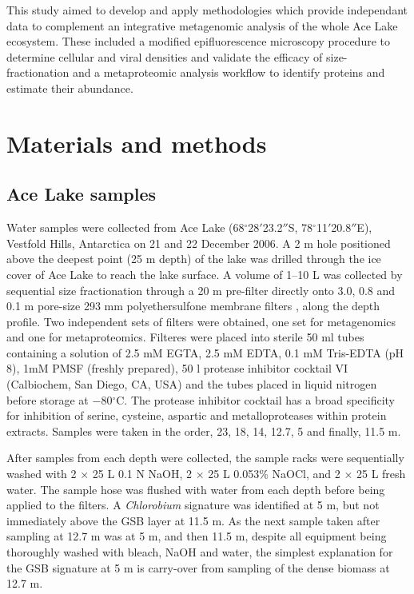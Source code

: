 This study aimed to develop and apply methodologies which provide independant data to complement an integrative metagenomic analysis of the whole Ace Lake ecosystem.
These included a modified epifluorescence microscopy procedure to determine cellular and viral densities and validate the efficacy of size-fractionation and a metaproteomic analysis workflow to identify proteins and estimate their abundance.


\section{Materials and methods}
\label{sec:ace_mm}
\subsection{Ace Lake samples}
Water samples were collected from Ace Lake (68$^{\circ}$28$'$23.2$''$S, 78$^{\circ}$11$'$20.8$''$E), Vestfold Hills, Antarctica on 21 and 22 December 2006. 
A 2 m hole positioned above the deepest point (25 m depth) of the lake was drilled through the ice cover of Ace Lake to reach the lake surface.
A volume of 1--10 L was collected by sequential size fractionation through a 20 \textmu{}m pre-filter directly onto 3.0, 0.8 and 0.1 \textmu{}m pore-size 293 mm polyethersulfone membrane filters \cite{Rusch2007}, along the depth profile.
Two independent sets of filters were obtained, one set for metagenomics and one for metaproteomics.
Filteres were placed into sterile 50 ml tubes containing a solution of 2.5 mM EGTA, 2.5 mM EDTA, 0.1 mM Tris-EDTA (pH 8), 1mM PMSF (freshly prepared), 50 \textmu{}l protease inhibitor cocktail VI (Calbiochem, San Diego, \textsc{CA}, \textsc{USA}) and the tubes placed in liquid nitrogen before storage at $-$80$^{\circ}$C.
The protease inhibitor cocktail has a broad specificity for inhibition of serine, cysteine, aspartic and metalloproteases within protein extracts.
Samples were taken in the order, 23, 18, 14, 12.7, 5 and finally, 11.5 m.

After samples from each depth were collected, the sample racks were sequentially washed with 2 $\times$ 25 L 0.1 N NaOH, 2 $\times$ 25 L 0.053\% NaOCl, and 2 $\times$ 25 L fresh water. 
The sample hose was flushed with water from each depth before being applied to the filters. 
A \emph{Chlorobium} signature was identified at 5 m, but not immediately above the \ac{GSB} layer at 11.5 m. 
As the next sample taken after sampling at 12.7 m was at 5 m, and then 11.5 m, despite all equipment being thoroughly washed with bleach, NaOH and water, 
the simplest explanation for the \ac{GSB} signature at 5 m is carry-over from sampling of the dense biomass at 12.7 m. 

